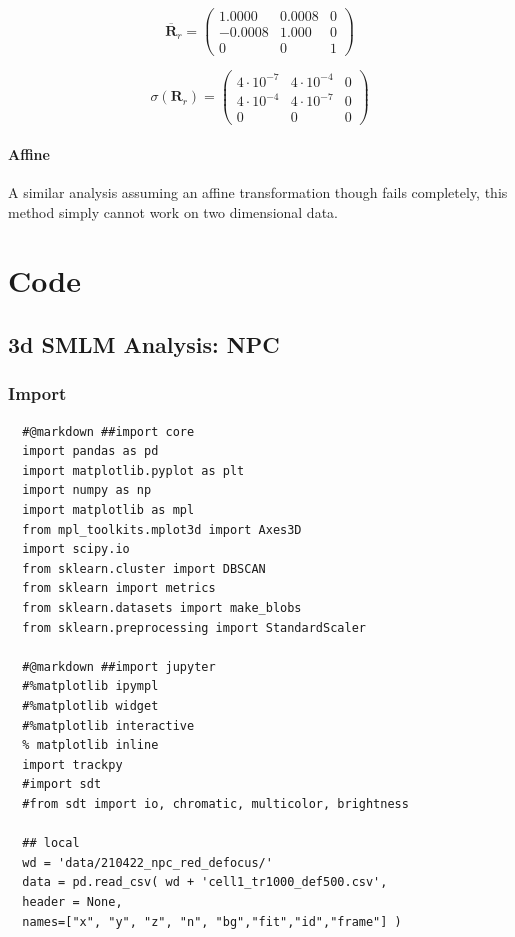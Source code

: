 \documentclass[11pt, a4paper, oneside, twocolumn]{report}
\renewcommand{\b}{\textbf}
\begin{document}
\begin{equation}
  \overline{\b{R}}_r =
  \begin{pmatrix}
    1.0000 & 0.0008 & 0 \\
    -0.0008 & 1.000 & 0 \\
    0 & 0 & 1
  \end{pmatrix}
\end{equation}

\begin{equation}
  \sigma( \b{R}_r ) =
  \begin{pmatrix}
    4\cdot10^{-7} & 4\cdot10^{-4} & 0 \\
    4\cdot10^{-4} & 4\cdot10^{-7} & 0 \\
    0 & 0 & 0
  \end{pmatrix}
\end{equation}


\subsubsection{Affine}

A similar analysis assuming an affine transformation though fails
completely, this method simply cannot work on two dimensional data.


\appendix


\onecolumn


\chapter{Code}\label{ch:code}


\section{3d SMLM Analysis: NPC}



\subsection{Import}

\begin{verbatim}
  #@markdown ##import core
  import pandas as pd
  import matplotlib.pyplot as plt
  import numpy as np
  import matplotlib as mpl
  from mpl_toolkits.mplot3d import Axes3D
  import scipy.io
  from sklearn.cluster import DBSCAN
  from sklearn import metrics
  from sklearn.datasets import make_blobs
  from sklearn.preprocessing import StandardScaler

  #@markdown ##import jupyter
  #%matplotlib ipympl
  #%matplotlib widget
  #%matplotlib interactive
  % matplotlib inline
  import trackpy
  #import sdt
  #from sdt import io, chromatic, multicolor, brightness
  
  ## local
  wd = 'data/210422_npc_red_defocus/'
  data = pd.read_csv( wd + 'cell1_tr1000_def500.csv',
  header = None,
  names=["x", "y", "z", "n", "bg","fit","id","frame"] )
\end{verbatim}
\end{document}
